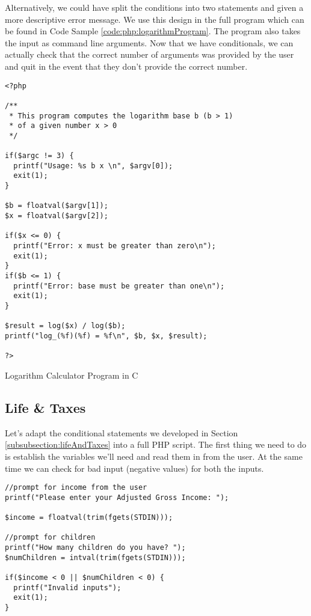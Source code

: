 Alternatively, we could have split the conditions into two statements and given
a more descriptive error message.  We use this design in the full program 
which can be found in Code Sample \ref{code:php:logarithmProgram}.  The 
program also takes the input as command line arguments.  Now that we have
conditionals, we can actually check that the correct number of arguments
was provided by the user and quit in the event that they don't provide
the correct number.

\begin{listing}[h]
\begin{verbatim}
<?php

/**
 * This program computes the logarithm base b (b > 1)
 * of a given number x > 0
 */

if($argc != 3) {
  printf("Usage: %s b x \n", $argv[0]);
  exit(1);
}

$b = floatval($argv[1]);
$x = floatval($argv[2]);

if($x <= 0) {
  printf("Error: x must be greater than zero\n");
  exit(1);
}
if($b <= 1) {
  printf("Error: base must be greater than one\n");
  exit(1);
}

$result = log($x) / log($b);
printf("log_(%f)(%f) = %f\n", $b, $x, $result);

?>
\end{verbatim}
\caption{Logarithm Calculator Program in C}
\label{code:php:logarithmProgram}
\end{listing}

\subsection{Life \& Taxes}

Let's adapt the conditional statements we developed in Section \ref{subsubsection:lifeAndTaxes}
into a full PHP script.  The first thing we need to do is establish the variables we'll need and
read them in from the user.  At the same time we can check for bad input (negative values)
for both the inputs.

\begin{verbatim}
//prompt for income from the user
printf("Please enter your Adjusted Gross Income: ");

$income = floatval(trim(fgets(STDIN)));

//prompt for children
printf("How many children do you have? ");
$numChildren = intval(trim(fgets(STDIN)));

if($income < 0 || $numChildren < 0) {
  printf("Invalid inputs");
  exit(1);
}
\end{verbatim}

